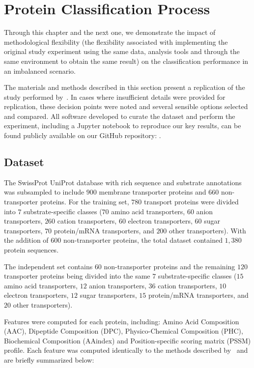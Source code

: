 \chapter{Protein Classification Process}

Through this chapter and the next one, we demonstrate 
the impact of methodological flexibility 
(the flexibility associated with implementing the original study experiment using the same data, 
analysis tools and through the same environment to obtain the same result) on the
classification performance in an imbalanced scenario.

\label{sec:materials}
The materials and methods described in this section present a replication of the study performed
by~\cite{mishra_prediction_2014}. In cases where insufficient details were provided for replication,
these decision points were noted and several sensible options selected and compared. All software 
developed to curate the dataset and perform the experiment, including a Jupyter notebook to reproduce our key results, can be found publicly available on
our GitHub repository: .

\section{Dataset}
\label{sec:dataset}

The SwissProt UniProt database with rich sequence and substrate
annotations~\cite{boeckmann2003swiss} was subsampled to include $900$ membrane transporter proteins and $660$
non-transporter proteins. For the training set, $780$ transport proteins were divided into $7$ substrate-specific 
classes ($70$ amino acid transporters, $60$ anion transporters, $260$ cation transporters, $60$ electron transporters, $60$ 
sugar transporters, $70$ protein/mRNA transporters, and $200$ other transporters). With the addition of 600 non-transporter
proteins, the total dataset contained $1,380$ protein sequences. 

The independent set contains $60$ non-transporter proteins
and the remaining $120$ transporter proteins being divided into the same $7$ substrate-specific classes 
($15$ amino acid transporters, $12$ anion transporters, $36$ cation transporters, $10$ electron transporters, 
$12$ sugar transporters, $15$ protein/mRNA transporters, and $20$ other transporters).

Features were computed for each protein, including: Amino Acid Composition (AAC), Dipeptide Composition (DPC),
Physico-Chemical Composition (PHC), Biochemical Composition (AAindex) and Position-specific scoring matrix (PSSM)
profile. Each feature was computed identically to the methods described by~\cite{mishra_prediction_2014} and are briefly
summarized below:


